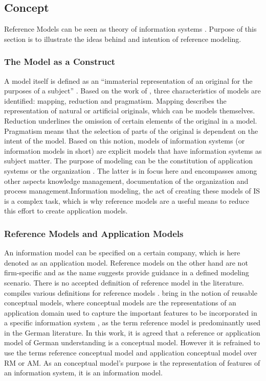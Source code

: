 		\subsection{Concept}
		
		Reference Models can be seen as theory of information systems \citep{Schutte1998}. Purpose of this section is to illustrate the ideas behind and intention of reference modeling.  
		
		\subsubsection{The Model as a Construct}
		
		
		A model itself is defined as an \enquote{immaterial representation of an original for the purposes of a subject} \citep[]{BeckerGOM2012}. Based on the work of \cite{Stachowiak1973}, three characteristics of models are identified: mapping, reduction and pragmatism. Mapping describes the representation of natural or artificial originals, which can be models themselves. Reduction underlines the omission of certain elements of the original in a model. Pragmatism means that the selection of parts of the original is dependent on the intent of the model. Based on this notion, models of information systems (or information models in short) are explicit models that have information systems as subject matter. The purpose of modeling can be the constitution of application systems or the organization \citep[]{Rosemann2012proc}. The latter is in focus here and encompasses among other aspects knowledge management, documentation of the organization and process management.Information modeling, the act of creating these models of \acrshort{IS} is a complex task, which is why reference models are a useful means to reduce this effort \citep{Becker2007} to create application models.
		 
			\subsubsection{Reference Models and Application Models}
			An information model can be specified on a certain company, which is here denoted as an application model. Reference models on the other hand are not firm-specific and as the name suggests provide guidance in a defined modeling scenario. There is no accepted definition of reference model in the literature. \citeauthor{thomas2006a} compiles various definitions for reference models \citep{thomas2006a}. \citeauthor{vom2006reusable} bring in the notion of reusable conceptual models, where conceptual models are the representations of an application domain used to capture the important features to be incorporated in a specific information system \citep[]{vom2006reusable}, as the term reference model is predominantly used in the German literature. In this work, it is agreed that a reference or application model of German understanding is a conceptual model. However it is refrained to use the terms reference conceptual model and application conceptual model over \acrfull{RM} or \acrfull{AM}. As an conceptual model's purpose is the representation of features of an information system, it is an information model. 
			
